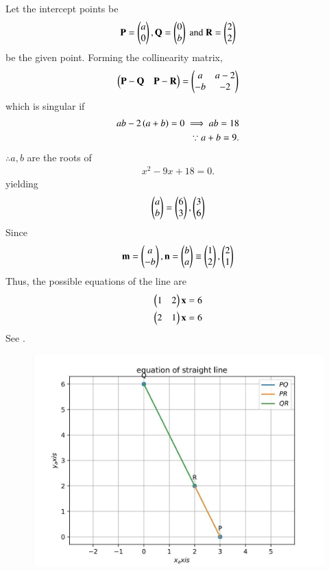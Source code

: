 Let  the intercept points be
\begin{align}
{\mathbf{P}}=\begin{pmatrix}
  a\\
  0\end{pmatrix}
 , {\mathbf{Q}}=\begin{pmatrix}
  0\\
  b\end{pmatrix}
  \text{ and }
   {\mathbf{R}}=\begin{pmatrix}
  2\\
  2\end{pmatrix}
\end{align}
be the given point.  
Forming the collinearity matrix,
\begin{align}
	\begin{pmatrix} \mathbf{P}-\mathbf{Q} &\mathbf{P}-\mathbf{R}\end{pmatrix} 
	=
	 \begin{pmatrix}
  a & a-2\\
  -b & -2
 \end{pmatrix}
\end{align}
which is singular if 
\begin{align}
 ab -2\left(a+b\right) = 0
 \implies ab = 18
		\label{eq:11/10/2/13-a+b}
		\\
\because  a + b = 9.
\end{align}
$\therefore a,b$
are the roots of
\begin{align}
	x^2 -9x +18 = 0.
\end{align}
yielding
\begin{align}
	\begin{pmatrix}a \\ b\end{pmatrix} = \begin{pmatrix}6 \\ 3\end{pmatrix}, \begin{pmatrix}3\\6\end{pmatrix}
\end{align}
Since 
\begin{align}
	\mathbf{m} = \begin{pmatrix}a \\ -b\end{pmatrix},
	\mathbf{n} = \begin{pmatrix}b \\ a\end{pmatrix} \equiv \begin{pmatrix}1 \\ 2\end{pmatrix}, \begin{pmatrix}2\\1\end{pmatrix}
\end{align}
Thus, the possible equations of the line are 
\begin{align}
\begin{pmatrix}1 & 2\end{pmatrix}\mathbf{x} = 6
	\\
	\begin{pmatrix}2&1\end{pmatrix}\mathbf{x} = 6
\end{align}
		See .
	\begin{figure}[!ht]
		\centering
 \includegraphics[width=\columnwidth]{chapters/11/10/2/13/figs/assign4.png}
		\caption{}
		\label{fig:11/10/2/13}
  	\end{figure}
